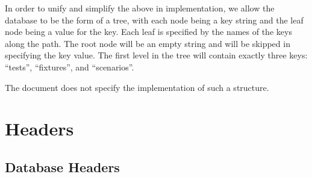 \documentclass{article}
\begin{document}
In order to unify and simplify the above in implementation, we allow
the database to be the form of a tree, with each node being a key
string and the leaf node being a value for the key. Each leaf is
specified by the names of the keys along the path. The root node will
be an empty string and will be skipped in specifying the key
value. The first level in the tree will contain exactly three keys:
``tests'', ``fixtures'', and ``scenarios''.

The document does not specify the implementation of such a structure.

\pagebreak

\section{Headers}
\subsection{Database Headers}
\end{document}
